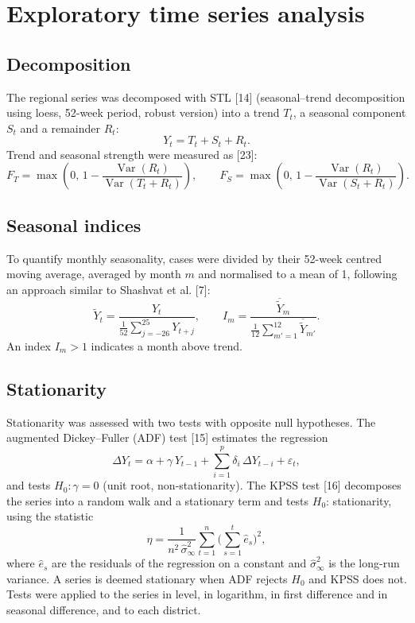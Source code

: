 \documentclass[11pt]{article}
\begin{document}
\section{Exploratory time series analysis}
\subsection{Decomposition}
The regional series was decomposed with STL [14] (seasonal–trend decomposition using loess, 52-week period, robust version) into a trend $T_t$, a seasonal component $S_t$ and a remainder $R_t$:
\begin{equation}
Y_t=T_t+S_t+R_t .
\label{eq:stl}
\end{equation}
Trend and seasonal strength were measured as [23]:
\begin{equation}
F_T=\max\!\left(0,\,1-\frac{\operatorname{Var}(R_t)}{\operatorname{Var}(T_t+R_t)}\right),\qquad F_S=\max\!\left(0,\,1-\frac{\operatorname{Var}(R_t)}{\operatorname{Var}(S_t+R_t)}\right).
\label{eq:force}
\end{equation}

\subsection{Seasonal indices}
To quantify monthly seasonality, cases were divided by their 52-week centred moving average, averaged by month $m$ and normalised to a mean of 1, following an approach similar to Shashvat et al. [7]:
\begin{equation}
\tilde{Y}_t=\frac{Y_t}{\frac{1}{52}\sum_{j=-26}^{25}Y_{t+j}},\qquad I_m=\frac{\overline{\tilde{Y}}_{m}}{\frac{1}{12}\sum_{m'=1}^{12}\overline{\tilde{Y}}_{m'}} .
\label{eq:indice}
\end{equation}
An index $I_m>1$ indicates a month above trend.

\subsection{Stationarity}
Stationarity was assessed with two tests with opposite null hypotheses. The augmented Dickey–Fuller (ADF) test [15] estimates the regression
\begin{equation}
\Delta Y_t=\alpha+\gamma\,Y_{t-1}+\sum_{i=1}^{p}\delta_i\,\Delta Y_{t-i}+\varepsilon_t ,
\label{eq:adf}
\end{equation}
and tests $H_0:\gamma=0$ (unit root, non-stationarity). The KPSS test [16] decomposes the series into a random walk and a stationary term and tests $H_0$: stationarity, using the statistic
\begin{equation}
\eta=\frac{1}{n^{2}\,\hat{\sigma}^{2}_{\infty}}\sum_{t=1}^{n}\Big(\sum_{s=1}^{t}\hat{e}_s\Big)^{2},
\label{eq:kpss}
\end{equation}
where $\hat{e}_s$ are the residuals of the regression on a constant and $\hat{\sigma}^{2}_{\infty}$ is the long-run variance. A series is deemed stationary when ADF rejects $H_0$ and KPSS does not. Tests were applied to the series in level, in logarithm, in first difference and in seasonal difference, and to each district.
\end{document}
